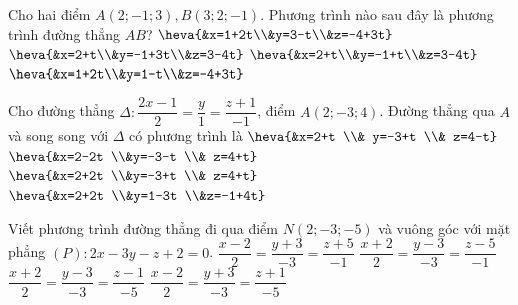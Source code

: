 \begin{ex}
	Cho hai điểm $A(2;-1;3), B(3;2;-1)$. Phương trình nào sau đây là phương trình đường thẳng $AB$?
	\choice
	{$\heva{&x=1+2t\\&y=3-t\\&z=-4+3t}$}
	{\True $\heva{&x=2+t\\&y=-1+3t\\&z=3-4t}$}
	{$\heva{&x=2+t\\&y=-1+t\\&z=3-4t}$}
	{$\heva{&x=1+2t\\&y=1-t\\&z=-4+3t}$}
\end{ex}

\begin{ex}
	Cho đường thẳng $\Delta: \dfrac{2x-1}{2}=\dfrac{y}{1}=\dfrac{z+1}{-1}$, điểm $A(2;-3;4)$. Đường thẳng qua $A$ và song song với $\Delta$ có phương trình là
	\choice
	{\True $\heva{&x=2+t  \\&	y=-3+t  \\&	z=4-t}$}
	{$\heva{&x=2-2t  \\&y=-3-t  \\&	z=4+t}$}
	{$\heva{&x=2+2t  \\&y=-3+t  \\&	z=4+t}$}
	{ $\heva{&x=2+2t  \\&y=1-3t  \\&z=-1+4t}$}
\end{ex}

\begin{ex}
	Viết phương trình đường thẳng đi qua điểm $N(2;-3;-5)$ và vuông góc với mặt phẳng $(P): 2x-3y-z+2=0$.
	\choice
	{\True $\dfrac{x-2}{2}=\dfrac{y+3}{-3}=\dfrac{z+5}{-1}$}
	{$\dfrac{x+2}{2}=\dfrac{y-3}{-3}=\dfrac{z-5}{-1}$}
	{$\dfrac{x+2}{2}=\dfrac{y-3}{-3}=\dfrac{z-1}{-5}$}
	{$\dfrac{x-2}{2}=\dfrac{y+3}{-3}=\dfrac{z+1}{-5}$}
\end{ex}

